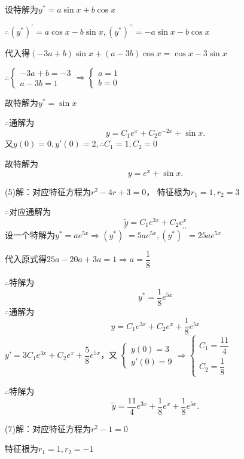   设特解为${y^*} = a\sin x + b\cos x$

  $\therefore {\left( {{y^*}} \right)^\prime } = a\cos x - b\sin x,{\left( {{y^*}} \right)^{\prime \prime }} =  - a\sin x - b\cos x$

  代入得$\left( { - 3a + b} \right)\sin x + \left( {a - 3b} \right)\cos x = \cos x - 3\sin x$

  $\therefore \begin{cases}
    { - 3a + b =  - 3} \\
    {a - 3b = 1}
  \end{cases} \Rightarrow \begin{cases}
    {a = 1} \\
    {b = 0}
  \end{cases}$

  故特解为${y^*} = \sin x$

  $\therefore $通解为\[y = {C_1}{e^x} + {C_2}{e^{ - 2x}} + \sin x.\]
  又$y\left( 0 \right) = 0,y'\left( 0 \right) = 2,\therefore {C_1} = 1,{C_2} = 0$

  故特解为\[y = {e^x} + \sin x.\]

  (5)解：对应特征方程为${r^2} - 4r + 3 = 0$，
  特征根为${r_1} = 1,{r_2} = 3$

  $\therefore $对应通解为\[\tilde y = {C_1}{e^{3x}} + {C_2}{e^x}\]
  设一个特解为${y^*} = a{e^{5x}} \Rightarrow {\left( {{y^*}} \right)^\prime } = 5a{e^{5x}},{\left( {{y^*}} \right)^{\prime \prime }} = 25a{e^{5x}}$

  代入原式得$25a - 20a + 3a = 1 \Rightarrow a = \dfrac{1}{8}$

  $\therefore $特解为\[{y^*} = \dfrac{1}{8}{e^{5x}}\]
  $\therefore $通解为\[ y = {C_1}{e^{3x}} + {C_2}{e^x} + \dfrac{1}{8}{e^{5x}}\]
  $y' = 3{C_1}{e^{3x}} + {C_2}{e^x} + \dfrac{5}{8}{e^{5x}}$，又
  $\begin{cases}
    {y\left( 0 \right) = 3} \\
    {y'\left( 0 \right) = 9}
  \end{cases} \Rightarrow \begin{cases}
    {{C_1} = \dfrac{{11}}{4}} \\
    {{C_2} = \dfrac{1}{8}}
  \end{cases}$

  $\therefore $特解为\[\tilde y = \dfrac{{11}}{4}{e^{3x}} + \dfrac{1}{8}{e^x} + \dfrac{1}{8}{e^{5x}}.\]

  (7)解：对应特征方程为${r^2} - 1 = 0$

  特征根为${r_1} = 1,{r_2} =  - 1$

